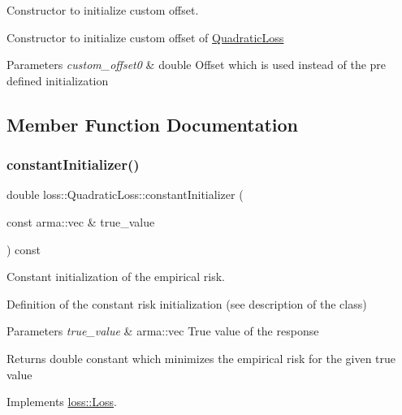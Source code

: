 Constructor to initialize custom offset. 

Constructor to initialize custom offset of {\ttfamily \mbox{\hyperlink{classloss_1_1_quadratic_loss}{Quadratic\+Loss}}}


\begin{DoxyParams}{Parameters}
{\em custom\+\_\+offset0} & {\ttfamily double} Offset which is used instead of the pre defined initialization \\
\hline
\end{DoxyParams}


\subsection{Member Function Documentation}
\mbox{\label{classloss_1_1_quadratic_loss_a43989f3fbecc27351513afe1136cdf38}} 
\subsubsection{\texorpdfstring{constant\+Initializer()}{constantInitializer()}}
{\footnotesize\ttfamily double loss\+::\+Quadratic\+Loss\+::constant\+Initializer (\begin{DoxyParamCaption}\item[{const arma\+::vec \&}]{true\+\_\+value }\end{DoxyParamCaption}) const\hspace{0.3cm}{\ttfamily [virtual]}}



Constant initialization of the empirical risk. 

Definition of the constant risk initialization (see description of the class)


\begin{DoxyParams}{Parameters}
{\em true\+\_\+value} & {\ttfamily arma\+::vec} True value of the response\\
\hline
\end{DoxyParams}
\begin{DoxyReturn}{Returns}
{\ttfamily double} constant which minimizes the empirical risk for the given true value 
\end{DoxyReturn}


Implements \mbox{\hyperlink{classloss_1_1_loss_a65fe7dcd9370e6a549b8d1cc95fc8798}{loss\+::\+Loss}}.

